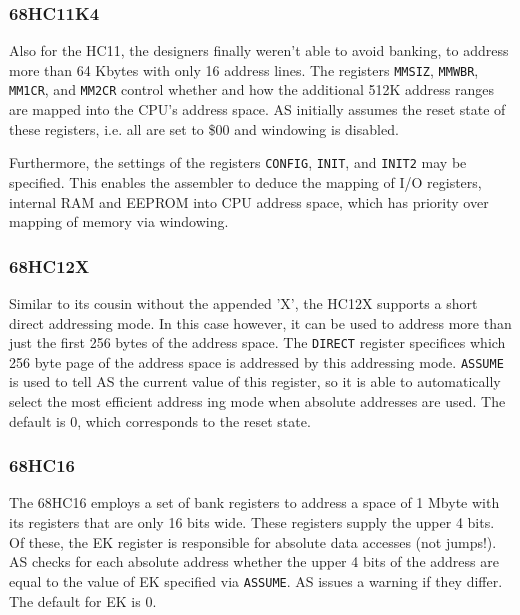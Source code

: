 \documentclass[12pt,twoside]{report}
\newcommand{\tty}[1]{{\tt #1}}
\begin{document}

\subsubsection{68HC11K4}

Also for the HC11, the designers finally weren't able to avoid banking, to
address more than 64 Kbytes with only 16
address lines.  The registers {\tt MMSIZ}, {\tt MMWBR}, {\tt MM1CR}, and
{\tt MM2CR} control whether and how the additional 512K address ranges are
mapped into the CPU's address space.  AS initially assumes the reset
state of these registers, i.e. all are set to \$00 and windowing is
disabled.

Furthermore, the settings of the registers {\tt CONFIG}, {\tt INIT}, and
{\tt INIT2} may be specified.  This enables the assembler to deduce the mapping
of I/O registers, internal RAM and EEPROM into CPU address space, which
has priority over mapping of memory via windowing.


\subsubsection{68HC12X}

Similar to its cousin without the appended 'X', the HC12X supports a short
direct addressing mode.  In this case however, it can be used to address
more than just the first 256 bytes of the address space.  The {\tt DIRECT}
register specifices which 256 byte page of the address space is addressed
by this addressing mode.  {\tt ASSUME} is used to tell AS the current
value of this register, so it is able to automatically select the most
efficient address ing mode when absolute addresses are used.  The default
is 0, which corresponds to the reset state.


\subsubsection{68HC16}

The 68HC16 employs a set of bank registers to address a space of 1
Mbyte with its registers that are only 16 bits wide.  These registers
supply the upper 4 bits.  Of these, the EK register is responsible
for absolute data accesses (not jumps!).  AS checks for each absolute
address whether the upper 4 bits of the address are equal to the
value of EK specified via \tty{ASSUME}.  AS issues a warning if they
differ.  The default for EK is 0.
\end{document}
